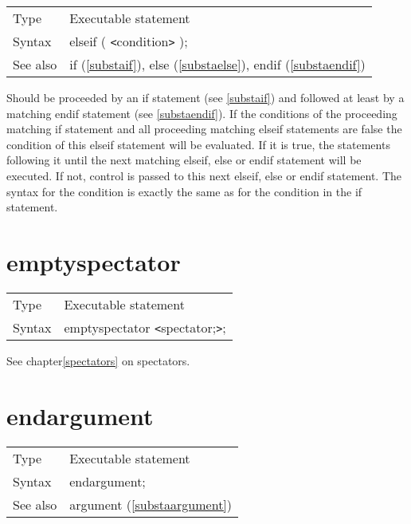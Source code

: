 \noindent \begin{tabular}{ll}
Type & Executable statement\\
Syntax & elseif ( {\tt<}condition{\tt>} );
\\ See also & if (\ref{substaif}),
              else (\ref{substaelse}),
              endif (\ref{substaendif})
\end{tabular} \vspace{4mm}

\noindent Should be proceeded by an if 
statement (see \ref{substaif}) and followed at least by a matching 
endif 
statement (see \ref{substaendif}). If the conditions of the proceeding 
matching if statement and all proceeding matching
elseif statements are false the 
condition of this elseif statement will be evaluated. If it is true, the 
statements following it until the next matching elseif,
else or endif statement will be executed. 
If not, control is passed to this next elseif, else or endif statement. The 
syntax for the condition is exactly the same as for the condition in the if 
statement. \vspace{10mm}
 

\section{emptyspectator}
\label{substaemptyspectator}

\noindent \begin{tabular}{ll}
Type & Executable statement\\
Syntax & emptyspectator {\tt<}spectator;{\tt>};
\end{tabular} \vspace{4mm}

\noindent See chapter\ref{spectators} on spectators.
\vspace{10mm}


\section{endargument}
\label{substaendargument}

\noindent \begin{tabular}{ll}
Type & Executable statement\\
Syntax & endargument; \\
See also & argument (\ref{substaargument})
\end{tabular} \vspace{4mm}

